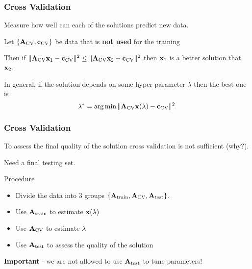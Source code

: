 \documentclass[12pt,fleqn]{beamer}
\begin{document}
\begin{frame}[fragile]
	\frametitle{Cross Validation}

Measure how well can each of the solutions predict new data.

\bigskip

Let $\{ {\bf A}_{\rm CV}, {\bf c}_{\rm CV} \}$ be data that is {\bf not used} for the training 

\bigskip

Then if $\|{\bf A}_{\rm CV} {\bf x}_1 - {\bf c}_{\rm CV}\|^2 \le 
\|{\bf A}_{\rm CV} {\bf x}_2 - {\bf c}_{\rm CV}\|^2$
then ${\bf x}_1$ is a better solution that ${\bf x}_2$.

\bigskip

\pause

In general, if the solution depends on some hyper-parameter $\lambda$ then the best one is
$$ \lambda^* = {\rm arg}\min \|{\bf A}_{\rm CV} {\bf x}(\lambda) - {\bf c}_{\rm CV}\|^2. $$

\end{frame}

\begin{frame}[fragile]
	\frametitle{Cross Validation}

To assess the final quality of the solution cross validation is not sufficient (why?).

\bigskip

Need a final testing set.

\bigskip

Procedure
\begin{itemize}
\item Divide the data into 3 groups $\{ {\bf A}_{\rm train}, {\bf A}_{\rm CV}, {\bf A}_{\rm test} \}$.
\item Use ${\bf A}_{\rm train}$ to estimate ${\bf x}(\lambda)$
\item Use ${\bf A}_{\rm CV}$ to estimate $\lambda$
\item Use ${\bf A}_{\rm test}$ to assess the quality of the solution
\end{itemize}

\pause

{\bf Important} -  we are not allowed to use ${\bf A}_{\rm test}$ to tune parameters!




\end{frame}
\end{document}
